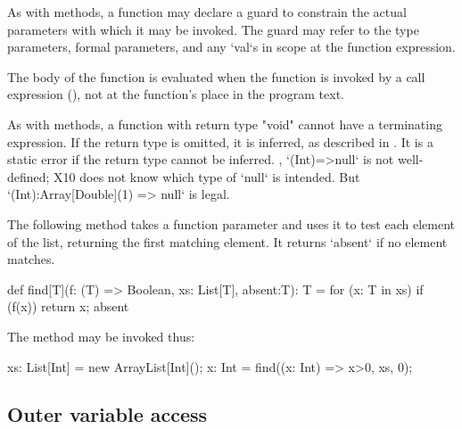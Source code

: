 \label{ClosureGuard}

As with methods, a function may declare a guard to
constrain the actual parameters with which it may be invoked.
The guard may refer to the type parameters, formal parameters,
and any \xcd`val`s in scope at the function expression.

The body of the function is evaluated when the function is
invoked by a call expression (), not at the function's
place in the program text.

As with methods, a function with return type \xcd"void" cannot
have a terminating expression. 
If the return type is omitted, it is inferred, as described in
.
It is a static error if the return type cannot be inferred.  \Eg,
\xcd`(Int)=>null` is not well-defined; X10 does not know which type of
\xcd`null` is intended.  
But \xcd`(Int):Array[Double](1) => null` is legal.


\begin{example}
The following method takes a function parameter and uses it to
test each element of the list, returning the first matching
element.  It returns \xcd`absent` if no element matches.

\begin{xten}

def find[T](f: (T) => Boolean, xs: List[T], absent:T): T = {
  for (x: T in xs)
    if (f(x)) return x;
  absent
  }
\end{xten}

The method may be invoked thus:
\begin{xten}
xs: List[Int] = new ArrayList[Int]();
x: Int = find((x: Int) => x>0, xs, 0);
\end{xten}

\end{example}



\subsection{Outer variable access}

